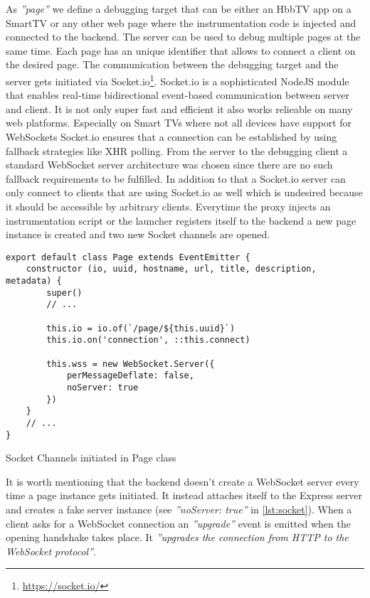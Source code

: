 As \textit{''page''} we define a debugging target that can be either an HbbTV app on a SmartTV or
any other web page where the instrumentation code is injected and connected to the backend. The
server can be used to debug multiple pages at the same time. Each page has an unique identifier
that allows to connect a client on the desired page. The communication between the debugging target
and the server gets initiated via Socket.io\footnote{\url{https://socket.io/}}. Socket.io is a
sophisticated NodeJS module that enables real-time bidirectional event-based communication between
server and client. It is not only super fast and efficient it also works relieable on many web
platforms. Especially on Smart TVs where not all devices have support for WebSockets Socket.io
ensures that a connection can be established by using fallback strategies like XHR polling. From
the server to the debugging client a standard WebSocket server architecture was chosen since
there are no such fallback requirements to be fulfilled. In addition to that a Socket.io server
can only connect to clients that are using Socket.io as well which is undesired because it should
be accessible by arbitrary clients. Everytime the proxy injects an instrumentation script or the
launcher registers itself to the backend a new page instance is created and two new Socket channels
are opened.

\begin{listing}[H]
\begin{verbatim}
export default class Page extends EventEmitter {
    constructor (io, uuid, hostname, url, title, description, metadata) {
        super()
        // ...

        this.io = io.of(`/page/${this.uuid}`)
        this.io.on('connection', ::this.connect)

        this.wss = new WebSocket.Server({
            perMessageDeflate: false,
            noServer: true
        })
    }
    // ...
}
\end{verbatim}
\caption{Socket Channels initiated in Page class}
\label{lst:socket}
\end{listing}

It is worth mentioning that the backend doesn't create a WebSocket server every time a page instance
gets initiated. It instead attaches itself to the Express server and creates a fake server instance
(see \textit{''noServer: true''} in \ref{lst:socket}). When a client asks for a WebSocket connection
an \textit{''upgrade''} event is emitted when the opening handshake takes place. It \textit{''upgrades
the connection from HTTP to the WebSocket protocol''}\cite{socket}.

